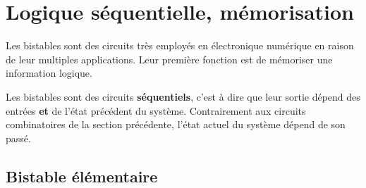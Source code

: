 \documentclass{../template/labo}
\begin{document}
\newpage
\section{Logique séquentielle, mémorisation}

\begin{info}
Les bistables sont des circuits très employés en électronique numérique en raison de leur multiples applications. Leur première fonction est de mémoriser une information logique.

Les bistables sont des circuits \textbf{séquentiels}, c'est à dire que leur sortie dépend des entrées \textbf{et} de l'état précédent du système. Contrairement aux circuits combinatoires de la section précédente, l'état actuel du système dépend de son passé.
\end{info}

\subsection{Bistable élémentaire}
\end{document}
